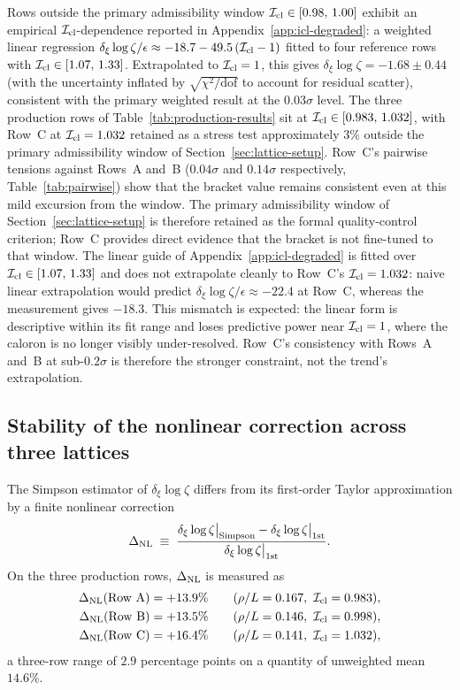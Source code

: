 \documentclass[a4paper,11pt]{article}
\theoremstyle{definition}
\newcommand{\Icl}{\mathcal{I}_{\rm cl}}
\begin{document}
Rows outside the primary admissibility window
$\Icl \in [0.98,\,1.00]$ exhibit an empirical $\Icl$-dependence
reported in Appendix~\ref{app:icl-degraded}: a weighted linear
regression $\delta_\xi \log\zeta / \epsilon \approx -18.7 -
49.5\,(\Icl - 1)$ fitted to four reference rows with
$\Icl \in [1.07,\,1.33]$. Extrapolated to $\Icl = 1$, this gives
$\delta_\xi \log\zeta = -1.68 \pm 0.44$ (with the uncertainty
inflated by $\sqrt{\chi^2/\mathrm{dof}}$ to account for residual
scatter), consistent with the primary weighted result at the
$0.03\sigma$ level. The three production rows
of Table~\ref{tab:production-results} sit at
$\Icl \in [0.983,\,1.032]$, with Row~C at $\Icl = 1.032$ retained
as a stress test approximately $3\%$ outside the primary
admissibility window of Section~\ref{sec:lattice-setup}. Row~C's
pairwise tensions against Rows~A and~B ($0.04\sigma$ and
$0.14\sigma$ respectively, Table~\ref{tab:pairwise}) show that the
bracket value remains consistent even at this mild excursion from
the window. The primary admissibility window of
Section~\ref{sec:lattice-setup} is therefore retained as the formal
quality-control criterion; Row~C provides direct evidence that the
bracket is not fine-tuned to that window.
The linear guide of Appendix~\ref{app:icl-degraded} is fitted over
$\Icl \in [1.07,\,1.33]$ and does not extrapolate cleanly to
Row~C's $\Icl = 1.032$: naive linear extrapolation would predict
$\delta_\xi\log\zeta/\epsilon \approx -22.4$ at Row~C, whereas the
measurement gives $-18.3$. This mismatch is expected: the linear
form is descriptive within its fit range and loses predictive
power near $\Icl = 1$, where the caloron is no longer visibly
under-resolved. Row~C's consistency with Rows~A and~B at
sub-$0.2\sigma$ is therefore the stronger constraint, not the
trend's extrapolation.

\subsection{Stability of the nonlinear correction across three lattices}
\label{subsec:universality}

The Simpson estimator of $\delta_\xi \log\zeta$ differs from its
first-order Taylor approximation by a finite nonlinear correction
\begin{equation}
\Delta_{\rm NL} \;\equiv\;
\frac{\delta_\xi \log\zeta\bigr|_{\rm Simpson}
      - \delta_\xi \log\zeta\bigr|_{\rm 1st}}
     {\delta_\xi \log\zeta\bigr|_{\rm 1st}}.
\label{eq:Delta-NL}
\end{equation}
On the three production rows, $\Delta_{\rm NL}$ is measured as
\begin{align*}
\Delta_{\rm NL}(\text{Row A}) &= +13.9\%
  \qquad (\rho/L = 0.167,\ \Icl = 0.983),\\
\Delta_{\rm NL}(\text{Row B}) &= +13.5\%
  \qquad (\rho/L = 0.146,\ \Icl = 0.998),\\
\Delta_{\rm NL}(\text{Row C}) &= +16.4\%
  \qquad (\rho/L = 0.141,\ \Icl = 1.032),
\end{align*}
a three-row range of $2.9$ percentage points on a quantity of
unweighted mean $14.6\%$.
\end{document}

